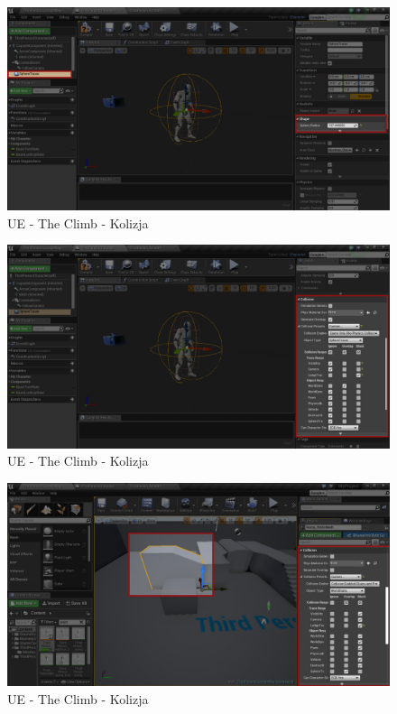 \documentclass[brudnopis]{xmgr}
\begin{document}
\begin{figure}[!htb]
    \begin{center}
    \includegraphics[scale=0.35]{Screeny/UE-Climb-Sphere02.png}
    \end{center}
    \caption{UE - The Climb - Kolizja}
\end{figure}

\begin{figure}[!htb]
    \begin{center}
    \includegraphics[scale=0.35]{Screeny/UE-Climb-Sphere03.png}
    \end{center}
    \caption{UE - The Climb - Kolizja}
\end{figure}

\begin{figure}[!htb]
    \begin{center}
    \includegraphics[scale=0.35]{Screeny/UE-Climb-ObjectCollision.png}
    \end{center}
    \caption{UE - The Climb - Kolizja}
\end{figure}
\end{document}
